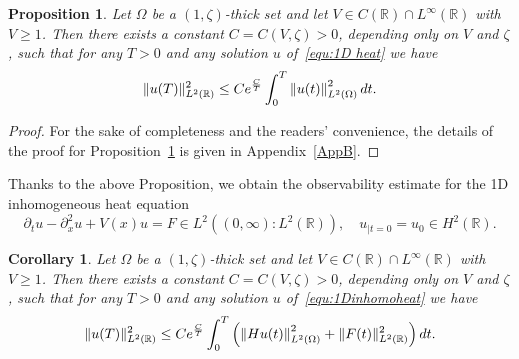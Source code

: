 \documentclass[a4paper,reqno]{amsart}
\newtheorem{corollary}[theorem]{Corollary}
\newtheorem{proposition}[theorem]{Proposition}
\theoremstyle{definition}
\numberwithin{equation}{section}
\newcommand{\R}{\mathbb{R}}
\def \R {{\mathbb{R} }}
\def \d {{\rm{d}}}
\begin{document}
\begin{proposition}\label{prop:heat}
    Let $\Omega$ be a $(1,\zeta)$-thick set and let $V\in C(\R)\cap L^{\infty}(\R)$ with $V\ge 1$. 
Then there exists a constant $C=C(V,\zeta)>0$, depending only on $V$ and $\zeta$, such that for any $T>0$ and any solution $u$ of~\eqref{equ:1D heat} we have 
  \begin{equation*}
  \|u(T)\|_{L^{2}(\R)}^{2}\le Ce^{\frac{C}{T}}\int_{0}^{T}\left\|u(t)\right\|^{2}_{L^{2}(\Omega)}\d t.
  \end{equation*}
  \end{proposition}

  \begin{proof}
  For the sake of completeness and the readers' convenience, the details of the proof for Proposition~\ref{prop:heat} is given in Appendix~\ref{AppB}.  
  \end{proof}

Thanks to the above Proposition, we obtain the observability estimate for the 1D inhomogeneous heat equation
\begin{equation}\label{equ:1Dinhomoheat}
    \partial_{t}u-\partial_{x}^{2}u+V(x)u=F\in L^{2}((0,\infty):L^{2}(\R)),\quad  u_{|t=0}=u_{0}\in H^{2}(\R).
    \end{equation}

\begin{corollary}\label{coro:1Dheat}
   Let $\Omega$ be a $(1,\zeta)$-thick set and let $V\in C(\R)\cap L^{\infty}(\R)$ with $V\ge 1$. 
Then there exists a constant $C=C(V,\zeta)>0$, depending only on $V$ and $\zeta$, such that for any $T>0$ and any solution $u$ of~\eqref{equ:1Dinhomoheat} we have 
  \begin{equation*}
  \|u(T)\|_{L^{2}(\R)}^{2}\le Ce^{\frac{C}{T}}\int_{0}^{T}\left(\left\|Hu(t)\right\|^{2}_{L^{2}(\Omega)}+\|F(t)\|^{2}_{L^{2}(\R)}\right)\d t.
  \end{equation*}
  \end{corollary}
\end{document}
